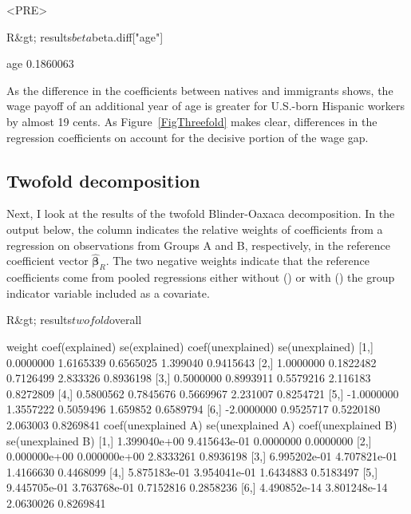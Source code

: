 <PRE>\documentclass[nojss]{jss}
\begin{document}
\begin{CodeInput}
R&gt; results$beta$beta.diff["age"]
\end{CodeInput}

\begin{CodeOutput}
      age 
0.1860063
\end{CodeOutput}

As the difference in the  coefficients between natives and immigrants shows, the wage payoff of an additional year of age is greater for U.S.-born Hispanic workers by almost 19 cents. As Figure~\ref{FigThreefold} makes clear, differences in the regression coefficients on  account for the decisive portion of the wage gap.

\subsection[Twofold decomposition]{Twofold decomposition}
Next, I look at the results of the twofold Blinder-Oaxaca decomposition. In the output below, the  column indicates the relative weights of coefficients from a regression on observations from Groups A and B, respectively, in the reference coefficient vector $\boldsymbol{\hat{\beta}}_{R}$. The two negative weights indicate that the reference coefficients come from pooled regressions either without () or with () the group indicator variable included as a covariate.

\begin{CodeInput}
R&gt; results$twofold$overall
\end{CodeInput}

\begin{CodeOutput}
         weight coef(explained) se(explained) coef(unexplained) se(unexplained)
[1,]  0.0000000       1.6165339     0.6565025          1.399040       0.9415643
[2,]  1.0000000       0.1822482     0.7126499          2.833326       0.8936198
[3,]  0.5000000       0.8993911     0.5579216          2.116183       0.8272809
[4,]  0.5800562       0.7845676     0.5669967          2.231007       0.8254721
[5,] -1.0000000       1.3557222     0.5059496          1.659852       0.6589794
[6,] -2.0000000       0.9525717     0.5220180          2.063003       0.8269841
     coef(unexplained A) se(unexplained A) coef(unexplained B) se(unexplained B)
[1,]        1.399040e+00      9.415643e-01           0.0000000         0.0000000
[2,]        0.000000e+00      0.000000e+00           2.8333261         0.8936198
[3,]        6.995202e-01      4.707821e-01           1.4166630         0.4468099
[4,]        5.875183e-01      3.954041e-01           1.6434883         0.5183497
[5,]        9.445705e-01      3.763768e-01           0.7152816         0.2858236
[6,]        4.490852e-14      3.801248e-14           2.0630026         0.8269841
\end{CodeOutput}
\end{document}
